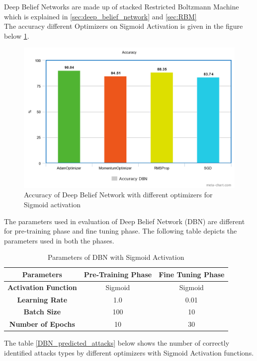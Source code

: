 \documentclass[12pt, a4paper]{report}
\begin{document}
Deep Belief Networks are made up of stacked Restricted Boltzmann Machine which is explained in \ref{sec:deep_belief_network} and \ref{sec:RBM} \\ 
The accuracy different Optimizers on Sigmoid Activation is given in the figure below \ref{fig:dbn_accu_sigmoid}.\\ \par
\begin{figure}[ht]
\centering
\captionsetup{justification=centering,margin=2cm}
\includegraphics[width=13cm]{DBN_accuracy_optimizer.png}
\caption{ Accuracy of Deep Belief Network with different optimizers for Sigmoid activation }
\label{fig:dbn_accu_sigmoid}
\end{figure}


The parameters used in evaluation of Deep Belief Network (DBN) are different for pre-training phase and fine tuning phase. The following table depicts the parameters used in both the phases.\\ \par

\begin{table}[ht]
\centering
\captionsetup{justification=centering,margin=2cm}
\begin{tabular}{|c|c|c|}
\hline
\textbf{Parameters}          & \textbf{Pre-Training Phase} & \textbf{Fine Tuning Phase} \\ \hline
\textbf{Activation Function} & Sigmoid                     & Sigmoid                    \\ \hline
\textbf{Learning Rate}       & 1.0                         & 0.01                        \\ \hline
\textbf{Batch Size}          & 100                         & 10                         \\ \hline
\textbf{Number of Epochs}    & 10                          & 30                         \\ \hline
\end{tabular}
\caption{Parameters of DBN with Sigmoid Activation}
\label{DBNSigmoidMomentum}
\end{table}
\clearpage
The table \ref{DBN_predicted_attacks} below shows the number of correctly identified attacks types by different optimizers with Sigmoid Activation functions.
\end{document}
